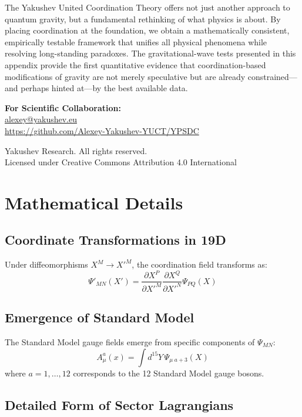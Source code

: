 \documentclass[12pt,a4paper]{article}
\theoremstyle{remark}
\begin{document}
	The Yakushev United Coordination Theory offers not just another approach to quantum gravity, but a fundamental rethinking of what physics is about. By placing coordination at the foundation, we obtain a mathematically consistent, empirically testable framework that unifies all physical phenomena while resolving long-standing paradoxes. The gravitational-wave tests presented in this appendix provide the first quantitative evidence that coordination-based modifications of gravity are not merely speculative but are already constrained—and perhaps hinted at—by the best available data.
	
	\begin{center}
		\vspace{1cm}
		\textbf{For Scientific Collaboration:}\\
		\url{alexey@yakushev.eu}\\
		\url{https://github.com/Alexey-Yakushev-YUCT/YPSDC}
		
		\vspace{0.5cm}
		 Yakushev Research. All rights reserved.\\
		Licensed under Creative Commons Attribution 4.0 International
	\end{center}
	
	\appendix
	\section{Mathematical Details}
	\label{app:math-details}
	
	\subsection{Coordinate Transformations in 19D}
	
	Under diffeomorphisms $X^M \to X'^M$, the coordination field transforms as:
	\[
	\Psi'_{MN}(X') = \frac{\partial X^P}{\partial X'^M} \frac{\partial X^Q}{\partial X'^N} \Psi_{PQ}(X)
	\]
	
	\subsection{Emergence of Standard Model}
	
	The Standard Model gauge fields emerge from specific components of $\Psi_{MN}$:
	\[
	A_\mu^a(x) = \int d^{15}Y \, \Psi_{\mu\;a+3}(X)
	\]
	where $a=1,\dots,12$ corresponds to the 12 Standard Model gauge bosons.
	
	\subsection{Detailed Form of Sector Lagrangians}
	
\end{document}
